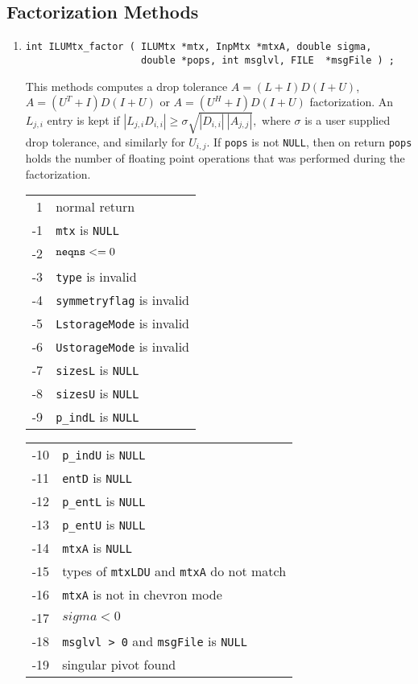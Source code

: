 \subsection{Factorization Methods}
\label{subsection:ILUMtx:proto:factor}
\par
\begin{enumerate}
\item
\begin{verbatim}
int ILUMtx_factor ( ILUMtx *mtx, InpMtx *mtxA, double sigma,
                    double *pops, int msglvl, FILE  *msgFile ) ;
\end{verbatim}
This methods computes a drop tolerance
$A = (L + I)D(I + U)$, $A = (U^T + I)D(I + U)$ or
$A = (U^H + I)D(I + U)$ factorization.
An $L_{j,i}$ entry is kept if
$
|L_{j,i} D_{i,i}| \ge \sigma \sqrt{|D_{i,i}| \ |A_{j,j}|},
$
where $\sigma$ is a user supplied drop tolerance,
and similarly for $U_{i,j}$.
If {\tt pops} is not {\tt NULL}, then
on return {\tt *pops} holds the number of floating point operations
that was performed during the factorization.
\par {}
\begin{center}
\begin{tabular}{rl}
 1 & normal return \\
-1 & {\tt mtx} is {\tt NULL} \\
-2 & ${\tt neqns} <= 0$ \\
-3 & {\tt type} is invalid \\
-4 & {\tt symmetryflag} is invalid \\
-5 & {\tt LstorageMode} is invalid \\
-6 & {\tt UstorageMode} is invalid \\
-7 & {\tt sizesL} is {\tt NULL} \\
-8 & {\tt sizesU} is {\tt NULL} \\
-9 & {\tt p\_indL} is {\tt NULL} \\
\end{tabular}
\quad
\begin{tabular}{rl}
-10 & {\tt p\_indU} is {\tt NULL} \\
-11 & {\tt entD} is {\tt NULL} \\
-12 & {\tt p\_entL} is {\tt NULL} \\
-13 & {\tt p\_entU} is {\tt NULL} \\
-14 & {\tt mtxA} is {\tt NULL} \\
-15 & types of {\tt mtxLDU} and {\tt mtxA} do not match \\
-16 & {\tt mtxA} is not in chevron mode \\
-17 & $sigma < 0$ \\
-18 & {\tt msglvl > 0} and {\tt msgFile} is {\tt NULL} \\
-19 & singular pivot found
\end{tabular}
\end{center}
\end{enumerate}
\par
\par
